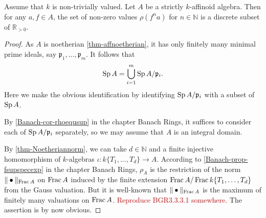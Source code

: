 \begin{lemma}\label{prop-rhodiscrete}
    Assume that $k$ is non-trivially valued.
    Let $A$ be a strictly $k$-affinoid algebra. Then for any $a,f\in A$, the set of non-zero values $\rho(f^n a)$ for $n\in \mathbb{N}$ is a discrete subset of $\mathbb{R}_{>0}$.
\end{lemma}
\begin{proof}
    As $A$ is noetherian \cref{thm-affnoetherian}, it has only finitely many minimal prime ideals, say $\mathfrak{p}_1,\ldots,\mathfrak{p}_m$. It follows that 
    \[
        \operatorname{Sp} A=\bigcup_{i=1}^m \operatorname{Sp} A/\mathfrak{p}_i.
    \]
    Here we make the obvious identification by identifying $\operatorname{Sp} A/\mathfrak{p}_i$ with a subset of $\operatorname{Sp} A$.

    By \cref{Banach-cor-rhoequsup} in the chapter Banach Rings, it suffices to consider each of $\operatorname{Sp} A/\mathfrak{p}_i$ separately, so we may assume that $A$ is an integral domain. 
    
    By \cref{thm-Noetheriannorm}, we can take $d\in \mathbb{N}$ and a finite injective homomorphism of $k$-algebras $\iota:k\{T_1,\ldots,T_d\}\rightarrow A$. According to \cref{Banach-prop-fsupspecexp} in the chapter Banach Rings, $\rho_A$ is the restriction of the norm $\|\bullet\|_{\operatorname{Frac} A}$ on $\operatorname{Frac} A$ induced by the finite extension $\operatorname{Frac} A/\operatorname{Frac} k\{T_1,\ldots,T_d\}$ from the Gauss valuation. But it is well-known that $\|\bullet\|_{\operatorname{Frac} A}$ is the maximum of finitely many valuations on $\operatorname{Frac} A$. \textcolor{red}{Reproduce BGR3.3.3.1 somewhere.} The assertion is by now obvious.
\end{proof}

